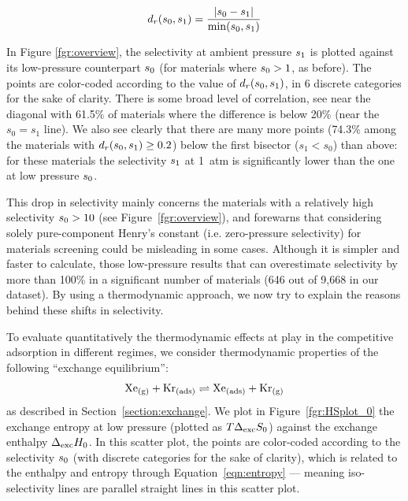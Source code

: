 \documentclass[main.tex]{subfiles}
\begin{document}
  \begin{equation} \label{eqn:reldiff}
      d_r(s_{\text{0}},s_{\text{1}}) = \dfrac{\lvert s_{\text{0}} - s_{\text{1}} \rvert}{\min(s_{\text{0}},s_{\text{1}})}
  \end{equation}
  
  In Figure \ref{fgr:overview}, the selectivity at ambient pressure $s_{\text{1}}$ is plotted against its low-pressure counterpart $s_{\text{0}}$ (for materials where $s_{\text{0}} > 1$, as before). The points are color-coded according to the value of $d_r(s_{\text{0}},s_{\text{1}})$, in 6 discrete categories for the sake of clarity. There is some broad level of correlation, see near the diagonal with {61.5\%} of materials where the difference is below {20\%} (near the $s_0 = s_1$ line). We also see clearly that there are many more points ({74.3\%} among the materials with $d_r(s_{\text{0}},s_{\text{1}})\ge 0.2$) below the first bisector ($s_1 < s_0$) than above: for these materials the selectivity $s_{\text{1}}$ at 1~atm is significantly lower than the one at low pressure $s_{\text{0}}$.
  
  This drop in selectivity mainly concerns the materials with a relatively high selectivity $s_{\text{0}} > 10$ (see Figure~\ref{fgr:overview}), and forewarns that considering solely pure-component Henry's constant (i.e. zero-pressure selectivity) for materials screening could be misleading in some cases. Although it is simpler and faster to calculate, those low-pressure results that can overestimate selectivity by more than {100\%} in a significant number of materials (646 out of 9,668 in our dataset). By using a thermodynamic approach, we now try to explain the reasons behind these shifts in selectivity.
  
  To evaluate quantitatively the thermodynamic effects at play in the competitive adsorption in different regimes, we consider thermodynamic properties of the following ``exchange equilibrium'':
  \[
      \text{Xe}_{\text{(g)}} + \text{Kr}_{\text{(ads)}}
      \rightleftharpoons \text{Xe}_{\text{(ads)}} + \text{Kr}_{\text{(g)}}
  \]
  as described in Section~\ref{section:exchange}. We plot in Figure~\ref{fgr:HSplot_0} the exchange entropy at low pressure (plotted as $T\Delta_{\text{exc}}S_{\text{0}}$) against the 
  exchange enthalpy $\Delta_{\text{exc}}H_{\text{0}}$. In this scatter plot, the points are color-coded according to the selectivity $s_{\text{0}}$ (with discrete categories for the sake of clarity), which is related to the enthalpy and entropy through Equation~\ref{eqn:entropy} --- meaning iso-selectivity lines are parallel straight lines in this scatter plot.
  
\end{document}
